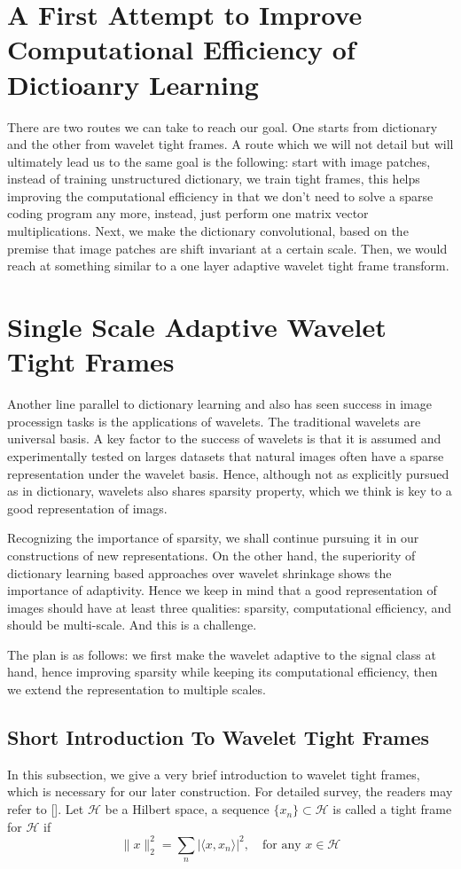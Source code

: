 \documentclass[a4paper]{article}
\begin{document}
\section{A First Attempt to Improve Computational Efficiency of Dictioanry Learning}
There are two routes we can take to reach our goal. One starts from dictionary and the other from wavelet tight frames. A route which we will not detail but will ultimately lead us to the same goal is the following: start with image patches, instead of training unstructured dictionary, we train tight frames, this helps improving the computational efficiency in that we don't need to solve a sparse coding program any more, instead, just perform one matrix vector multiplications. Next, we make the dictionary convolutional, based on the premise that image patches are shift invariant at a certain scale. Then, we would reach at something similar to a one layer adaptive wavelet tight frame transform. 

\section{Single Scale Adaptive Wavelet Tight Frames}
Another line parallel to dictionary learning and also has seen success in image processign tasks is the applications of wavelets. The traditional wavelets are universal basis. A key factor to the success of wavelets is that it is assumed and experimentally tested on larges datasets that natural images often have a sparse representation under the wavelet basis. Hence, although not as explicitly pursued as in dictionary, wavelets also shares sparsity property, which we think is key to a good representation of imags.

Recognizing the importance of sparsity, we shall continue pursuing it in our constructions of new representations. On the other hand, the superiority of dictionary learning based approaches over wavelet shrinkage shows the importance of adaptivity. Hence we keep in mind that a good representation of images should have at least three qualities: sparsity, computational efficiency, and should be multi-scale. And this is a challenge.

The plan is as follows: we first make the wavelet adaptive to the signal class at hand, hence improving sparsity while keeping its computational efficiency, then we extend the representation to multiple scales.

\subsection{Short Introduction To Wavelet Tight Frames}
In this subsection, we give a very brief introduction to wavelet tight frames, which is necessary for our later construction. For detailed survey, the readers may refer to []. Let $\mathcal{H}$ be a Hilbert space, a sequence $\{x_n\}\subset \mathcal{H}$ is called a tight frame for $\mathcal{H}$ if 
\[
	\|x\|_2^2 = \sum_n |\langle x,x_n\rangle |^2, \quad \textrm{for any } x\in \mathcal{H}
\]
\end{document}
